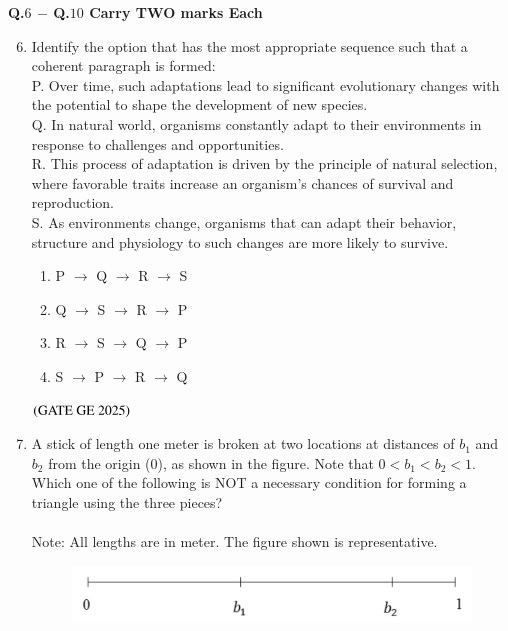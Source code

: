 \documentclass[journal,12pt,onecolumn]{IEEEtran}
\theoremstyle{remark}
\begin{document}
\textbf{Q.$6$ $-$ Q.$10$ Carry TWO marks Each}\\
\begin{enumerate}
\setcounter{enumi}{5}
\item Identify the option that has the most appropriate sequence such that a coherent paragraph is formed:\\
P. Over time, such adaptations lead to significant evolutionary changes with the potential to shape the development of new species.\\
Q. In natural world, organisms constantly adapt to their environments in response to challenges and opportunities.\\
R. This process of adaptation is driven by the principle of natural selection, where favorable traits increase an organism's chances of survival and reproduction.\\
S. As environments change, organisms that can adapt their behavior, structure and physiology to such changes are more likely to survive.
\begin{enumerate}
\item P $\rightarrow$ Q $\rightarrow$ R $\rightarrow$ S
\item Q $\rightarrow$ S $\rightarrow$ R $\rightarrow$ P
\item R $\rightarrow$ S $\rightarrow$ Q $\rightarrow$ P
\item S $\rightarrow$ P $\rightarrow$ R $\rightarrow$ Q
\end{enumerate}
\hfill $\left(\text{GATE GE 2025}\right)$
\bigskip
\item A stick of length one meter is broken at two locations at distances of $b_1$ and $b_2$ from the origin (0), as shown in the figure. Note that $0 < b_1 < b_2 < 1$. Which one of the following is NOT a necessary condition for forming a triangle using the three pieces?\\
\\
Note: All lengths are in meter. The figure shown is representative.\\
\begin{figure}[H]
    \centering
    \includegraphics[width=0.7\columnwidth]{figs/fig2.png}
    \caption{}
    \label{figs:fig12}
\end{figure}
\begin{enumerate}
\begin{multicols}{4}

\end{multicols}
\end{enumerate}
\end{enumerate}
\end{document}
